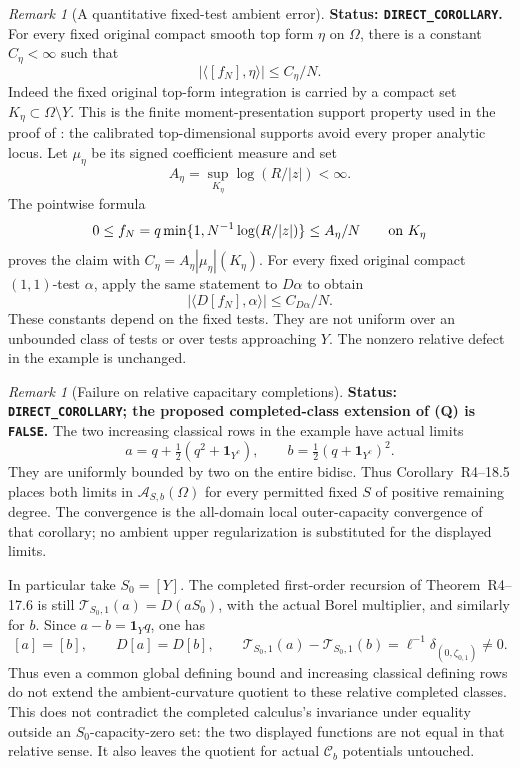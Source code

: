\documentclass[11pt,a4paper]{article}
\numberwithin{equation}{section}
\theoremstyle{definition}
\theoremstyle{remark}
\newtheorem{remark}[theorem]{Remark}
\begin{document}
\begin{remark}[A quantitative fixed-test ambient error]
\label{rem:r5-energy-fixed-test-rate}
\textbf{Status: \texttt{DIRECT\_COROLLARY}.}
For every fixed original compact smooth top form $\eta$ on
$\Omega$, there is a constant $C_\eta<\infty$ such that
\[
             |\langle[f_N],\eta\rangle|\leq C_\eta/N.
\]
Indeed the fixed original top-form integration is carried by a
compact set $K_\eta\subset\Omega\setminus Y$. This is the
finite moment-presentation support property used in the proof of
\cite[Lemma 4.6.1, pp.~72--73]{CLD12}: the calibrated
top-dimensional supports avoid every proper analytic locus.
Let $\mu_\eta$ be its signed coefficient measure and set
\[
 A_\eta=\sup_{K_\eta}\log(R/|z|)<\infty.
\]
The pointwise formula
\[
 0\leq f_N
   =q\min\{1,N^{-1}\log(R/|z|)\}
   \leq A_\eta/N\qquad\hbox{on }K_\eta
\]
proves the claim with $C_\eta=A_\eta|\mu_\eta|(K_\eta)$.
For every fixed original compact $(1,1)$-test $\alpha$,
apply the same statement to $D\alpha$ to obtain
\[
       |\langle D[f_N],\alpha\rangle|\leq C_{D\alpha}/N.
\]
These constants depend on the fixed tests. They are not uniform
over an unbounded class of tests or over tests approaching $Y$.
The nonzero relative defect in the example is unchanged.
\end{remark}

\begin{remark}[Failure on relative capacitary completions]
\label{rem:r5-completed-potential-quotient-false}
\textbf{Status: \texttt{DIRECT\_COROLLARY}; the proposed
completed-class extension of (Q) is \texttt{FALSE}.}
The two increasing classical rows in the example have actual limits
\[
 a=q+\tfrac12(q^2+\mathbf1_{Y^c}),\qquad
 b=\tfrac12(q+\mathbf1_{Y^c})^2.
\]
They are uniformly bounded by two on the entire bidisc. Thus
Corollary~\textup{R4--18.5} places both limits
in $\mathcal A_{S,b}(\Omega)$ for every
permitted fixed $S$ of positive remaining degree. The convergence
is the all-domain local outer-capacity convergence of that
corollary; no ambient upper regularization is substituted for
the displayed limits.

In particular take $S_0=[Y]$. The completed first-order recursion
of Theorem~\textup{R4--17.6} is still
$\mathcal T_{S_0,1}(a)=D(aS_0)$, with the actual Borel multiplier,
and similarly for $b$. Since $a-b=\mathbf1_Yq$, one has
\[
 [a]=[b],\qquad D[a]=D[b],\qquad
 \mathcal T_{S_0,1}(a)-\mathcal T_{S_0,1}(b)
      =\ell^{-1}\delta_{(0,\zeta_{0,1})}\ne0.
\]
Thus even a common global defining bound and increasing classical
defining rows do not extend the ambient-curvature quotient to
these relative completed classes. This does not contradict the
completed calculus's invariance under equality outside an
$S_0$-capacity-zero set: the two displayed functions are not
equal in that relative sense. It also leaves the quotient for
actual $\mathcal C_b$ potentials untouched.
\end{remark}
\end{document}
